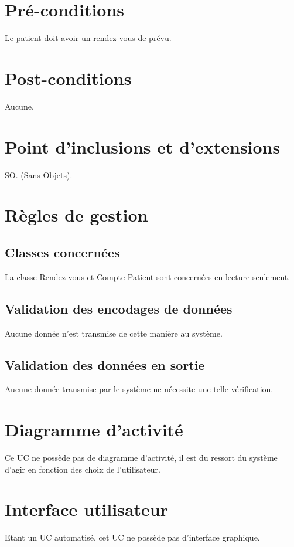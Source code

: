\section{Pré-conditions}

Le patient doit avoir un rendez-vous de prévu.

\section{Post-conditions}

Aucune.

\section{Point d'inclusions et d'extensions}

SO. (Sans Objets).
\section{Règles de gestion}

\subsection{Classes concernées}

La classe Rendez-vous et Compte Patient sont concernées en lecture seulement.

\subsection{Validation des encodages de données}

Aucune donnée n'est transmise de cette manière au système.

\subsection{Validation des données en sortie}

Aucune donnée transmise par le système ne nécessite une telle vérification.

\section{Diagramme d'activité}

Ce UC ne possède pas de diagramme d'activité, il est du ressort du système d'agir en fonction
des choix de l'utilisateur.

\section{Interface utilisateur}

Etant un UC automatisé, cet UC ne possède pas d'interface graphique.


